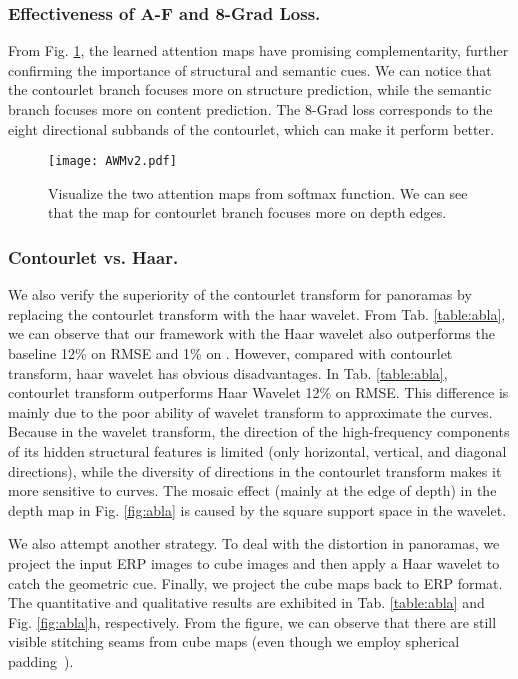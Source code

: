 \documentclass[10pt,times,mathptm,psfig,twocolumn,journals]{IEEEtran}
\begin{document}
\subsubsection{Effectiveness of A-F and 8-Grad Loss.}
From Fig. \ref{fig:AFdistribute}, the learned attention maps have promising complementarity, further confirming the importance of structural and semantic cues. We can notice that the contourlet branch focuses more on structure prediction, while the semantic branch focuses more on content prediction. The 8-Grad loss corresponds to the eight directional subbands of the contourlet, which can make it perform better. 
\begin{figure}[!h]
\centering
\texttt{[image: AWMv2.pdf]}
\caption{Visualize the two attention maps from softmax function. We can see that the map for contourlet branch  focuses more on depth edges.}
\label{fig:AFdistribute}
\end{figure}
\subsubsection{Contourlet vs. Haar.}\label{CvsH} We also verify the superiority of the contourlet transform for panoramas by replacing the contourlet transform with the haar wavelet. From Tab. \ref{table:abla}, we can observe that our framework with the Haar wavelet also outperforms the baseline 12\% on RMSE and 1\% on . However, compared with contourlet transform, haar wavelet has obvious disadvantages. In Tab. \ref{table:abla}, contourlet transform outperforms Haar Wavelet 12\% on RMSE. This difference is mainly due to the poor ability of wavelet transform to approximate the curves. Because in the wavelet transform, the direction of the high-frequency components of its hidden structural features is limited (only horizontal, vertical, and diagonal directions), while the diversity of directions in the contourlet transform makes it more sensitive to curves. The mosaic effect (mainly at the edge of depth) in the depth map in Fig. \ref{fig:abla} is caused by the square support space in the wavelet.

We also attempt another strategy. To deal with the distortion in panoramas, we project the input ERP images to cube images and then apply a Haar wavelet to catch the geometric cue. Finally, we project the cube maps back to ERP format. The quantitative and qualitative results are exhibited in Tab. \ref{table:abla} and Fig. \ref{fig:abla}h, respectively. From the figure, we can observe that there are still visible stitching seams from cube maps (even though we employ spherical padding~\cite{2020BiFuse}). 
\end{document}
